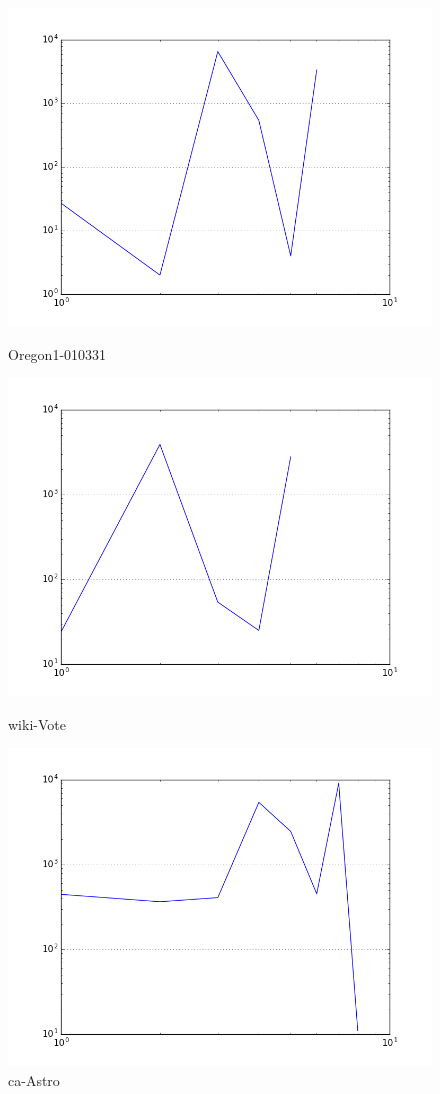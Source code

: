 \begin{figure}[H]
  \includegraphics[width=\linewidth]{img/oregon-010331/radius_dist.png}
  \caption*{Oregon1-010331}
\endminipage\hfill
{}
  \includegraphics[width=\linewidth]{img/wiki-Vote/radius_dist.png}
  \caption*{wiki-Vote}
\endminipage\hfill
{}
  \includegraphics[width=\linewidth]{img/ca-Astro/radius_dist.png}
  \caption*{ca-Astro}
\endminipage
\end{figure}
